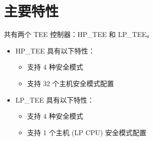 \documentclass[main\_\_CN.tex]{subfiles}
\begin{document}
\section{主要特性}\label{sec:permctrl-features}

\chipname{} 共有两个 TEE 控制器：HP\_TEE 和 LP\_TEE。
\begin{itemize}
    \item HP\_TEE 具有以下特性：
        \begin{itemize}
        \item 支持 4 种安全模式
        \item 支持 32 个主机安全模式配置
        \end{itemize}
    \item LP\_TEE 具有以下特性：
        \begin{itemize}
        \item 支持 4 种安全模式
        \item 支持 1 个主机 (LP CPU) 安全模式配置
        \end{itemize}
\end{itemize}
\end{document}
